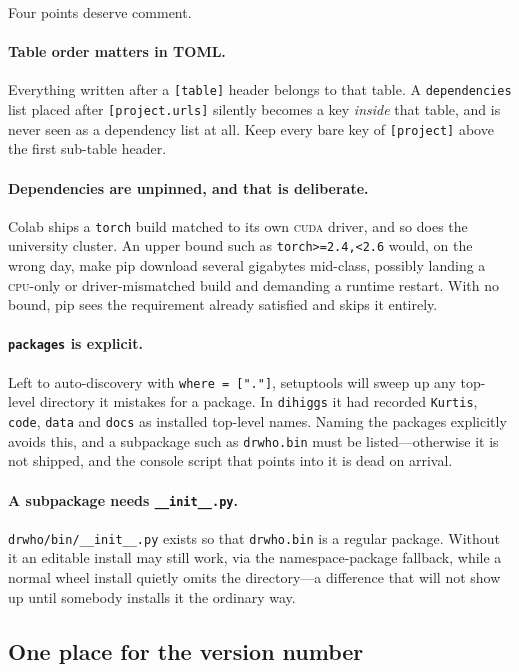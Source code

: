 \documentclass[11pt,a4paper]{article}
\newcommand{\pkg}[1]{\texttt{#1}}
\begin{document}
Four points deserve comment.

\paragraph{Table order matters in TOML.}
Everything written after a \texttt{[table]} header belongs to that table. A
\texttt{dependencies} list placed after \texttt{[project.urls]} silently becomes
a key \emph{inside} that table, and is never seen as a dependency list at all.
Keep every bare key of \texttt{[project]} above the first sub-table header.

\paragraph{Dependencies are unpinned, and that is deliberate.}
Colab ships a \pkg{torch} build matched to its own \textsc{cuda} driver, and so
does the university cluster. An upper bound such as
\texttt{torch>=2.4,<2.6} would, on the wrong day, make pip download several
gigabytes mid-class, possibly landing a \textsc{cpu}-only or driver-mismatched
build and demanding a runtime restart. With no bound, pip sees the requirement
already satisfied and skips it entirely.

\paragraph{\texttt{packages} is explicit.}
Left to auto-discovery with \texttt{where = ["."]}, setuptools will sweep up any
top-level directory it mistakes for a package. In \pkg{dihiggs} it had recorded
\texttt{Kurtis}, \texttt{code}, \texttt{data} and \texttt{docs} as installed
top-level names. Naming the packages explicitly avoids this, and a subpackage
such as \texttt{drwho.bin} must be listed---otherwise it is not shipped, and the
console script that points into it is dead on arrival.

\paragraph{A subpackage needs \texttt{\_\_init\_\_.py}.}
\texttt{drwho/bin/\_\_init\_\_.py} exists so that \texttt{drwho.bin} is a regular
package. Without it an editable install may still work, via the namespace-package
fallback, while a normal wheel install quietly omits the directory---a difference
that will not show up until somebody installs it the ordinary way.

\subsection{One place for the version number}
\end{document}
